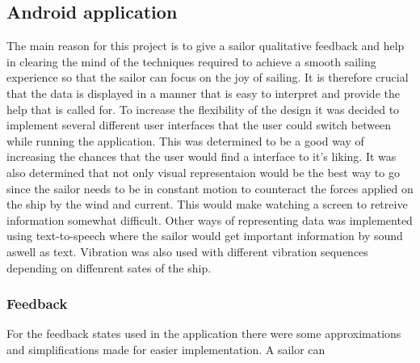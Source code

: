 \subsection{Android application}
The main reason for this project is to give a sailor qualitative feedback and help in clearing the mind of the techniques required to achieve a smooth sailing experience so that the sailor can focus on the joy of sailing. It is therefore crucial that the data is displayed in a manner that is easy to interpret and provide the help that is called for. To increase the flexibility of the design it was decided to implement several different user interfaces that the user could switch between while running the application. This was determined to be a good way of increasing the chances that the user would find a interface to it's liking. It was also determined that not only visual representaion would be the best way to go since the sailor needs to be in constant motion to counteract the forces applied on the ship by the wind and current. This would make watching a screen to retreive information somewhat difficult. Other ways of representing data was implemented using text-to-speech where the sailor would get important information by sound aswell as text. Vibration was also used with different vibration sequences depending on diffenrent sates of the ship.


\subsubsection{Feedback}
For the feedback states used in the application there were some approximations and simplifications made for easier implementation. A sailor can 
